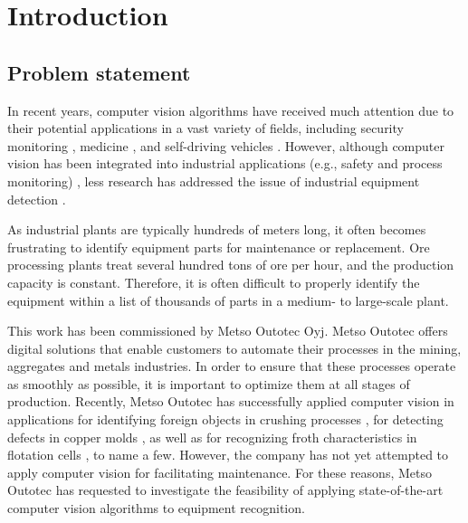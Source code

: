 \documentclass[english, 12pt, a4paper, elec, utf8, a-1b, online]{aaltothesis}
\begin{document}
\listoftodos
{}

\cleardoublepage

\section{Introduction}

\thispagestyle{empty}
\subsection{Problem statement}
In recent years, computer vision algorithms have received much attention due to their potential applications in a vast variety of fields, including security monitoring \cite{Awalgaonkar2020}, medicine \cite{9689485}, and self-driving vehicles \cite{Janai2017, Shan2018}. However, although computer vision has been integrated into industrial applications (e.g., safety and process monitoring) \cite{Awalgaonkar2020, Banf2022}, less research has addressed the issue of industrial equipment detection \cite{Wu2022, MALBURG2021581, Kim2020}. 

As industrial plants are typically hundreds of meters long, it often becomes frustrating to identify equipment parts for maintenance or replacement. Ore processing plants treat several hundred tons of ore per hour, and the production capacity is constant. Therefore, it is often difficult to properly identify the equipment within a list of thousands of parts in a medium- to large-scale plant.

This work has been commissioned by Metso Outotec Oyj.  Metso Outotec offers digital solutions that enable customers to automate their processes in the mining, aggregates and metals industries. In order to ensure that these processes operate as smoothly as possible, it is important to optimize them at all stages of production. Recently, Metso Outotec has successfully applied computer vision in applications for identifying foreign objects in crushing processes \cite{metso_outotec_2022}, for detecting defects in copper  molds \cite{metso_outotec_2022_2}, as well as for recognizing froth characteristics in flotation cells \cite{metso_outotec_2022_1}, to name a few. However, the company has not yet attempted to apply computer vision for facilitating maintenance. For these reasons, Metso Outotec has requested to investigate the feasibility of applying state-of-the-art computer vision algorithms to equipment recognition. 
\end{document}
